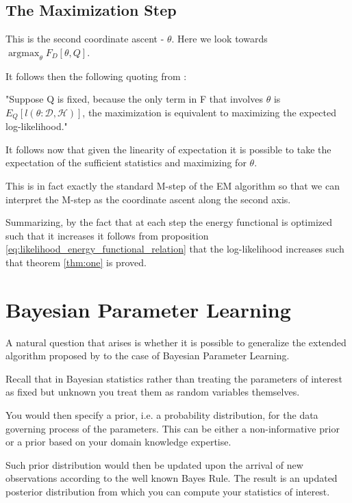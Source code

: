 \documentclass[11pt]{article}
\begin{document}
\begin{article}
\subsection{The Maximization Step}
\label{sec:org1af855b}

This is the second coordinate ascent - \(\theta\). Here we look
towards \(\operatorname*{argmax}_{\theta} F_D[\theta, Q]\).

It follows then the following quoting from
\cite{koller2009probabilistic}:

"Suppose Q is fixed, because the only term in F that involves \(\theta\) is
\(E_Q[l (\theta: \mathscr{D}, \mathscr{H})]\), the maximization is
equivalent to maximizing the expected log-likelihood."

It follows now that given the linearity of expectation it is
possible to take the expectation of the sufficient statistics and
maximizing for \(\theta\).

This is in fact exactly the standard M-step of the EM algorithm so
that we can interpret the M-step as the coordinate ascent along
the second axis. 

Summarizing, by the fact that at each step the energy functional is
optimized such that it increases it follows from proposition
\ref{eq:likelihood_energy_functional_relation} that the
log-likelihood increases such that theorem \ref{thm:one} is proved.


\section{Bayesian Parameter Learning}
\label{sec:orgcc3b816}

A natural question that arises is whether it is possible to
generalize the extended algorithm proposed by \cite{Mrad_2015} to the
case of Bayesian Parameter Learning.

Recall that in Bayesian statistics rather than treating the
parameters of interest as fixed but unknown you treat them as random
variables themselves.

You would then specify a prior, i.e. a probability distribution, for
the data governing process of the parameters. This can be either a
non-informative prior or a prior based on your domain knowledge
expertise.

Such prior distribution would then be updated upon the arrival of
new observations according to the well known Bayes Rule. The result
is an updated posterior distribution from which you can compute your
statistics of interest.



\end{article}
\end{document}
